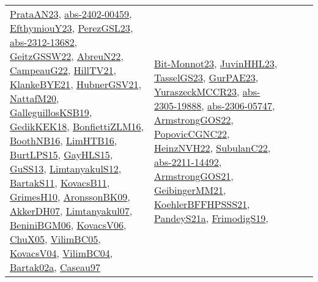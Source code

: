 {\begin{longtable}{lp{3cm}>{\raggedright}p{6cm}>{\raggedright}p{6cm}p{8cm}}
\href{articles/PrataAN23.pdf}{PrataAN23}\cite{PrataAN23}, \href{articles/abs-2402-00459.pdf}{abs-2402-00459}\cite{abs-2402-00459}, \href{papers/EfthymiouY23.pdf}{EfthymiouY23}\cite{EfthymiouY23}, \href{papers/PerezGSL23.pdf}{PerezGSL23}\cite{PerezGSL23}, \href{articles/abs-2312-13682.pdf}{abs-2312-13682}\cite{abs-2312-13682}, \href{papers/GeitzGSSW22.pdf}{GeitzGSSW22}\cite{GeitzGSSW22}, \href{articles/AbreuN22.pdf}{AbreuN22}\cite{AbreuN22}, \href{articles/CampeauG22.pdf}{CampeauG22}\cite{CampeauG22}, \href{papers/HillTV21.pdf}{HillTV21}\cite{HillTV21}, \href{papers/KlankeBYE21.pdf}{KlankeBYE21}\cite{KlankeBYE21}, \href{articles/HubnerGSV21.pdf}{HubnerGSV21}\cite{HubnerGSV21}, \href{papers/NattafM20.pdf}{NattafM20}\cite{NattafM20}, \href{papers/GalleguillosKSB19.pdf}{GalleguillosKSB19}\cite{GalleguillosKSB19}, \href{articles/GedikKEK18.pdf}{GedikKEK18}\cite{GedikKEK18}, \href{papers/BonfiettiZLM16.pdf}{BonfiettiZLM16}\cite{BonfiettiZLM16}, \href{papers/BoothNB16.pdf}{BoothNB16}\cite{BoothNB16}, \href{papers/LimHTB16.pdf}{LimHTB16}\cite{LimHTB16}, \href{papers/BurtLPS15.pdf}{BurtLPS15}\cite{BurtLPS15}, \href{papers/GayHLS15.pdf}{GayHLS15}\cite{GayHLS15}, \href{papers/GuSS13.pdf}{GuSS13}\cite{GuSS13}, \href{articles/LimtanyakulS12.pdf}{LimtanyakulS12}\cite{LimtanyakulS12}, \href{articles/BartakS11.pdf}{BartakS11}\cite{BartakS11}, \href{articles/KovacsB11.pdf}{KovacsB11}\cite{KovacsB11}, \href{papers/GrimesH10.pdf}{GrimesH10}\cite{GrimesH10}, \href{papers/AronssonBK09.pdf}{AronssonBK09}\cite{AronssonBK09}, \href{papers/AkkerDH07.pdf}{AkkerDH07}\cite{AkkerDH07}, \href{papers/Limtanyakul07.pdf}{Limtanyakul07}\cite{Limtanyakul07}, \href{papers/BeniniBGM06.pdf}{BeniniBGM06}\cite{BeniniBGM06}, \href{papers/KovacsV06.pdf}{KovacsV06}\cite{KovacsV06}, \href{papers/ChuX05.pdf}{ChuX05}\cite{ChuX05}, \href{articles/VilimBC05.pdf}{VilimBC05}\cite{VilimBC05}, \href{papers/KovacsV04.pdf}{KovacsV04}\cite{KovacsV04}, \href{papers/VilimBC04.pdf}{VilimBC04}\cite{VilimBC04}, \href{papers/Bartak02a.pdf}{Bartak02a}\cite{Bartak02a}, \href{papers/Caseau97.pdf}{Caseau97}\cite{Caseau97} & \href{papers/Bit-Monnot23.pdf}{Bit-Monnot23}\cite{Bit-Monnot23}, \href{papers/JuvinHHL23.pdf}{JuvinHHL23}\cite{JuvinHHL23}, \href{papers/TasselGS23.pdf}{TasselGS23}\cite{TasselGS23}, \href{articles/GurPAE23.pdf}{GurPAE23}\cite{GurPAE23}, \href{articles/YuraszeckMCCR23.pdf}{YuraszeckMCCR23}\cite{YuraszeckMCCR23}, \href{articles/abs-2305-19888.pdf}{abs-2305-19888}\cite{abs-2305-19888}, \href{articles/abs-2306-05747.pdf}{abs-2306-05747}\cite{abs-2306-05747}, \href{papers/ArmstrongGOS22.pdf}{ArmstrongGOS22}\cite{ArmstrongGOS22}, \href{papers/PopovicCGNC22.pdf}{PopovicCGNC22}\cite{PopovicCGNC22}, \href{articles/HeinzNVH22.pdf}{HeinzNVH22}\cite{HeinzNVH22}, \href{articles/SubulanC22.pdf}{SubulanC22}\cite{SubulanC22}, \href{articles/abs-2211-14492.pdf}{abs-2211-14492}\cite{abs-2211-14492}, \href{papers/ArmstrongGOS21.pdf}{ArmstrongGOS21}\cite{ArmstrongGOS21}, \href{papers/GeibingerMM21.pdf}{GeibingerMM21}\cite{GeibingerMM21}, \href{articles/KoehlerBFFHPSSS21.pdf}{KoehlerBFFHPSSS21}\cite{KoehlerBFFHPSSS21}, \href{articles/PandeyS21a.pdf}{PandeyS21a}\cite{PandeyS21a}, \href{papers/FrimodigS19.pdf}{FrimodigS19}\cite{FrimodigS19}, 
\end{longtable}}
